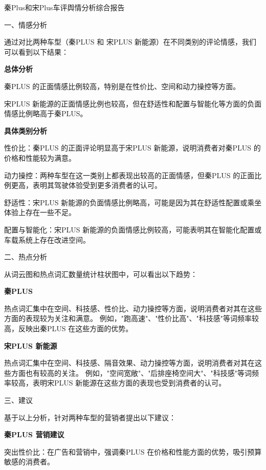 \documentclass[UTF8,a4paper,15pt,titlepage,oneside]{ctexbook}
\begin{document}
\begin{mdframed}[backgroundcolor=morandiLight!30, linecolor=morandiDark, linewidth=1pt]
\begin{center}
  秦Plus和宋Plus车评舆情分析综合报告
\end{center}

\noindent
一、情感分析

通过对比两种车型（秦PLUS 和 宋PLUS 新能源）在不同类别的评论情感，我们可以看到以下结果：

\noindent
\textbf{总体分析}

秦PLUS 的正面情感比例较高，特别是在性价比、空间和动力操控等方面。

宋PLUS 新能源的正面情感比例也较高，但在舒适性和配置与智能化等方面的负面情感比例略高于秦PLUS。

\noindent
\textbf{具体类别分析}

\noindent
性价比：秦PLUS 的正面评论明显高于宋PLUS 新能源，说明消费者对秦PLUS 的价格和性能较为满意。

\noindent
动力操控：两种车型在这一类别上都表现出较高的正面情感，但秦PLUS 的正面比例更高，表明其驾驶体验受到更多消费者的认可。

\noindent
舒适性：宋PLUS 新能源的负面情感比例略高，可能是因为其在舒适性配置或乘坐体验上存在一些不足。

\noindent
配置与智能化：宋PLUS 新能源的负面情感比例较高，可能表明其在智能化配置或车载系统上存在改进空间。

\noindent
二、热点分析

从词云图和热点词汇数量统计柱状图中，可以看出以下趋势：

\noindent
\textbf{秦PLUS}

热点词汇集中在空间、科技感、性价比、动力操控等方面，说明消费者对其在这些方面的表现较为关注和满意。
例如，"跑高速"、"性价比高"、"科技感"等词频率较高，反映出秦PLUS 在这些方面的优势。

\noindent
\textbf{宋PLUS 新能源}

热点词汇集中在空间、科技感、隔音效果、动力操控等方面，说明消费者对其在这些方面也有较高的关注。
例如，"空间宽敞"、"后排座椅空间大"、"科技感"等词频率较高，表明宋PLUS 新能源在这些方面的表现也受到消费者的认可。

\noindent
三、建议

基于以上分析，针对两种车型的营销者提出以下建议：

\noindent
\textbf{秦PLUS 营销建议}

突出性价比：在广告和营销中，强调秦PLUS 在价格和性能方面的优势，吸引预算敏感的消费者。


\end{mdframed}
\end{document}
